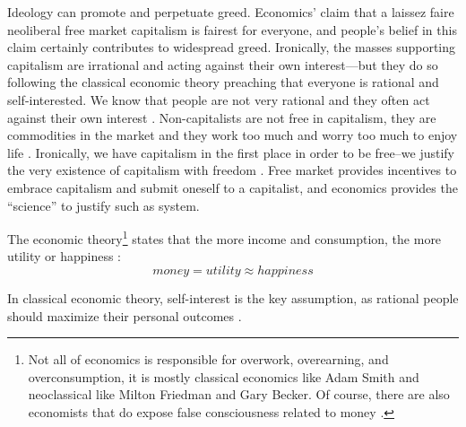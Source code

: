 \documentclass[10pt, letterpaper]{article}
\begin{document}
\begin{spacing}{1.8}

Ideology can promote and perpetuate greed. Economics' claim that a laissez faire
neoliberal free market capitalism is fairest for everyone, and people's belief
in this claim certainly contributes to widespread greed. Ironically, the masses supporting capitalism are irrational and acting against
their own interest---but they do so following the classical economic theory preaching that everyone is rational and self-interested. 
We know that people are not very rational and they often act against their own
interest \citep{akerlof10,ariely09,shiller15}. Non-capitalists are not
free in capitalism, they are commodities in the market and they work too much and worry too much to enjoy life \citep{aokJap14}. Ironically, we
have capitalism in the first place in order to be free--we justify the very
existence of capitalism with freedom \citep{hayek14,friedman09,glaeser11B}. Free
market provides incentives to embrace capitalism and submit oneself to a capitalist, and economics provides the ``science'' to justify such as system.


The economic theory\footnote{Not all of economics is responsible for overwork, overearning, and
overconsumption, it is mostly classical economics like Adam Smith and neoclassical like
Milton Friedman and Gary Becker. Of course, there are also economists that do
expose false consciousness related to money \citep[e.g,][]{kahneman06c}. %
} states that the more income and consumption, the
more utility or happiness \citep{autor10,becker08}: 
\begin{equation}
money 
  = utility \approx happiness
\end{equation}

In classical economic theory, self-interest is the key assumption, as rational people should maximize their personal outcomes \citep{seuntjens15b}.%


\end{spacing}
\end{document}

